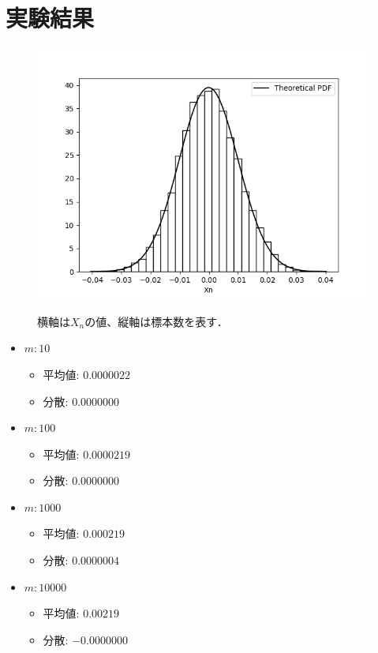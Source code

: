 \documentclass[fleqn, a4paper. 12pt]{ltjsarticle} %
\begin{document}
\section*{実験結果}
\begin{figure}[tb]
  \centering
  \includegraphics[width = \textwidth]{my_plot_4_1.png}
  \label{f11}
  \caption{横軸は$X_n$の値、縦軸は標本数を表す．}
\end{figure}
\begin{itemize}
  \item $m:10$
    \begin{itemize}
      \item 平均値: $0.0000022$
      \item 分散: $0.0000000$
    \end{itemize}
  \item $m:100$
    \begin{itemize}
      \item 平均値: $0.0000219$
      \item 分散: $0.0000000$
    \end{itemize}
  \item $m:1000$
    \begin{itemize}
      \item 平均値: $0.000219$
      \item 分散: $0.0000004$
    \end{itemize}
  \item $m:10000$
    \begin{itemize}
      \item 平均値: $0.00219$
      \item 分散: $-0.0000000$
    \end{itemize}
\end{itemize}
\end{document}
